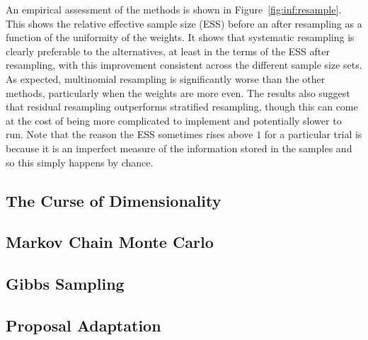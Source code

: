 An empirical assessment of the methods is shown in Figure~\ref{fig:inf:resample}.  This shows
the relative effective sample size (ESS) before an after resampling as a function of the uniformity of
the weights.  It shows that systematic resampling is clearly preferable to the alternatives, at least
in the terms of the ESS after resampling, with this improvement consistent across the different
sample size sets.  As expected, multinomial resampling is significantly worse than the other
methods, particularly when the weights are more even.  The results also suggest that residual
resampling outperforms stratified resampling, though this can come at the cost of being more
complicated to implement and potentially slower to run.  Note that the reason the ESS sometimes
rises above $1$ for a particular trial is because it is an imperfect measure of the information 
stored in the samples and so this simply happens by chance.

\subsection{The Curse of Dimensionality}
\label{sec:inf:foundation:curse}


\subsection{Markov Chain Monte Carlo}
\label{sec:inf:foundation:mcmc}

\subsection{Gibbs Sampling}
\label{sec:inf:foundation:gibbs}

\subsection{Proposal Adaptation}
\label{sec:inf:proposal-adapt}